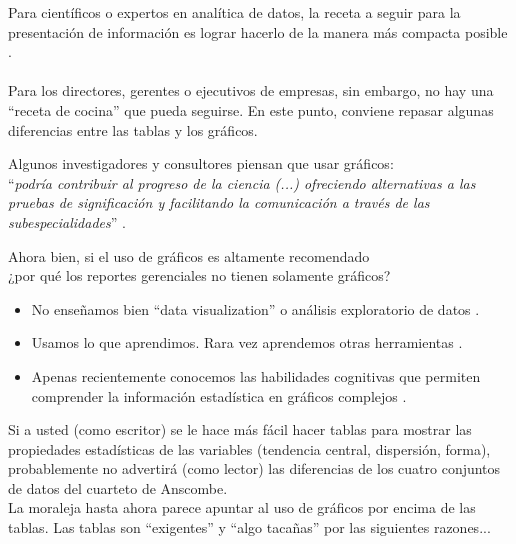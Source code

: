 \documentclass[aspectratio=169]{beamer}
\begin{document}
\begin{frame}
Para científicos o expertos en analítica de datos, la receta a seguir para la presentación de información es lograr hacerlo de la manera más compacta posible \cite{Smith2000a}.\\
\vspace{0.5cm}\\
Para los directores, gerentes o ejecutivos de empresas, sin embargo, no hay una ``receta de cocina'' que pueda seguirse. En este punto, conviene repasar algunas diferencias entre las tablas y los gráficos.
\end{frame}


\begin{frame}
Algunos investigadores y consultores piensan que usar gráficos:\\
\vspace{0.8cm}
``\textit{podría contribuir al progreso de la ciencia (...) ofreciendo alternativas a las pruebas de significación y facilitando la comunicación a través de las subespecialidades}'' \cite[p.749]{Smith2002}.
\end{frame}

\begin{frame}
\Large
Ahora bien, si el uso de gráficos es altamente recomendado
\\
\vspace{0.8cm}
\centering 
¿por qué los reportes gerenciales no tienen solamente gráficos?
\end{frame}

\begin{frame}
\begin{itemize}
    \item No enseñamos bien ``data visualization'' o análisis exploratorio de datos \cite{Tukey1977}.
    \vspace{0.3cm}
\pause
    \item Usamos lo que aprendimos. Rara vez aprendemos otras herramientas \cite{Elosua2009}.
    \vspace{0.3cm}
\pause
    \item Apenas recientemente conocemos las habilidades cognitivas que permiten comprender la información estadística en gráficos complejos \cite{Shah2011}.
\end{itemize}
\end{frame}

\begin{frame}
Si a usted (como escritor) se le hace más fácil hacer tablas para mostrar las propiedades estadísticas de las variables (tendencia central, dispersión, forma), probablemente no advertirá (como lector) las diferencias de los cuatro conjuntos de datos del cuarteto de Anscombe. \\
\vspace{0.5cm}
La moraleja hasta ahora parece apuntar al uso de gráficos por encima de las tablas. Las tablas son ``exigentes'' y ``algo tacañas'' por las siguientes razones...
\end{frame}
\end{document}
